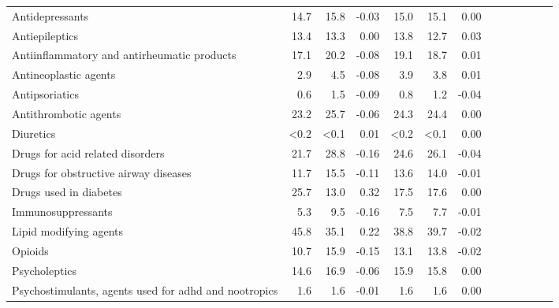 \documentclass[11pt,]{article}
\begin{document}
\begin{longtable}{lrrrrrrrrrrrr}
      Antidepressants & 14.7 & 15.8 & -0.03 & 15.0 & 15.1 &  0.00 \\ 
      Antiepileptics & 13.4 & 13.3 &  0.00 & 13.8 & 12.7 &  0.03 \\ 
      Antiinflammatory and antirheumatic products & 17.1 & 20.2 & -0.08 & 19.1 & 18.7 &  0.01 \\ 
      Antineoplastic agents &  2.9 &  4.5 & -0.08 &  3.9 &  3.8 &  0.01 \\ 
      Antipsoriatics &  0.6 &  1.5 & -0.09 &  0.8 &  1.2 & -0.04 \\ 
      Antithrombotic agents & 23.2 & 25.7 & -0.06 & 24.3 & 24.4 &  0.00 \\ 
      Diuretics & <0.2 & <0.1 &  0.01 & <0.2 & <0.1 &  0.00 \\ 
      Drugs for acid related disorders & 21.7 & 28.8 & -0.16 & 24.6 & 26.1 & -0.04 \\ 
      Drugs for obstructive airway diseases & 11.7 & 15.5 & -0.11 & 13.6 & 14.0 & -0.01 \\ 
      Drugs used in diabetes & 25.7 & 13.0 &  0.32 & 17.5 & 17.6 &  0.00 \\ 
      Immunosuppressants &  5.3 &  9.5 & -0.16 &  7.5 &  7.7 & -0.01 \\ 
      Lipid modifying agents & 45.8 & 35.1 &  0.22 & 38.8 & 39.7 & -0.02 \\ 
      Opioids & 10.7 & 15.9 & -0.15 & 13.1 & 13.8 & -0.02 \\ 
      Psycholeptics & 14.6 & 16.9 & -0.06 & 15.9 & 15.8 &  0.00 \\ 
      Psychostimulants, agents used for adhd and nootropics &  1.6 &  1.6 & -0.01 &  1.6 &  1.6 &  0.00 \\ 
   \bottomrule\end{longtable}
\clearpage
{}
\end{document}
